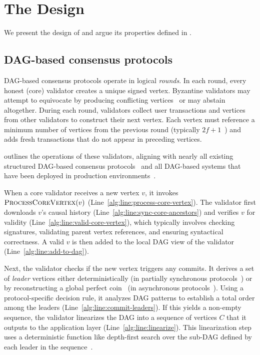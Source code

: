 \section{The \sysname Design} \label{sec:design}

We present the design of \sysname and argue its properties defined in .

\subsection{DAG-based consensus protocols} \label{sec:dag}

DAG-based consensus protocols operate in logical \emph{rounds}. In each round, every honest (core) validator creates a unique signed vertex. Byzantine validators may attempt to equivocate by producing conflicting vertices~\cite{dag-rider} or may abstain altogether. During each round, validators collect user transactions and vertices from other validators to construct their next vertex. Each vertex must reference a minimum number of vertices from the previous round (typically $2f + 1$~\cite{narwhal,bullshark,mysticeti}) and adds fresh transactions that do not appear in preceding vertices.

 outlines the operations of these validators, aligning with nearly all existing structured DAG-based consensus protocols~\cite{narwhal,bullshark,shoal,shoal++,mysticeti,dag-rider,dumbo-ng,dispersedledger,sailfish,bbca-chain,fino,gradeddag,cordial-miners,wahoo,lightdag,dai2024remora} and all DAG-based systems that have been deployed in production environments~\cite{narwhal,bullshark,mysticeti,hammerhead}.

When a core validator receives a new vertex $v$, it invokes $\Call{ProcessCoreVertex}{v}$ (Line~\ref{alg:line:process-core-vertex}). The validator first downloads $v$'s causal history (Line~\ref{alg:line:sync-core-ancestors}) and verifies $v$ for validity (Line~\ref{alg:line:valid-core-vertex}), which typically involves checking signatures, validating parent vertex references, and ensuring syntactical correctness. A valid $v$ is then added to the local DAG view of the validator (Line~\ref{alg:line:add-to-dag}).

Next, the validator checks if the new vertex triggers any commits. It derives a set of \emph{leader} vertices either deterministically (in partially synchronous protocols~\cite{bullshark,shoal,mysticeti}) or by reconstructing a global perfect coin~\cite{abraham2023bingo} (in asynchronous protocols~\cite{narwhal,cordial-miners}). Using a protocol-specific decision rule, it analyzes DAG patterns to establish a total order among the leaders (Line~\ref{alg:line:commit-leaders}). If this yields a non-empty sequence, the validator linearizes the DAG into a sequence of vertices $C$ that it outputs to the application layer (Line~\ref{alg:line:linearize}). This linearization step uses a deterministic function like depth-first search over the sub-DAG defined by each leader in the sequence~\cite{dag-rider,narwhal,bullshark}.

